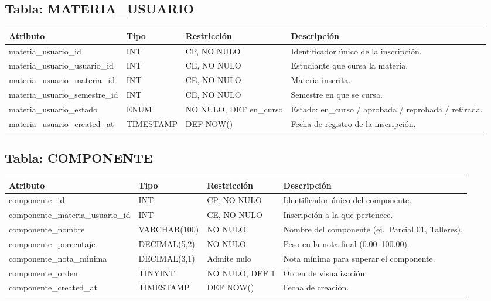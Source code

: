 \documentclass[12pt, letterpaper, twoside]{article}
\begin{document}
\subsection{Tabla: MATERIA\_USUARIO}

\begin{center}
\begin{tabular}{p{4.6cm} p{2.8cm} p{2.8cm} p{3.4cm}}
\toprule
\textbf{Atributo} & \textbf{Tipo} & \textbf{Restricción} & \textbf{Descripción} \\
\midrule
materia\_usuario\_id           & INT       & CP, NO NULO       & Identificador único de la inscripción. \\
materia\_usuario\_usuario\_id  & INT       & CE, NO NULO       & Estudiante que cursa la materia. \\
materia\_usuario\_materia\_id  & INT       & CE, NO NULO       & Materia inscrita. \\
materia\_usuario\_semestre\_id & INT       & CE, NO NULO       & Semestre en que se cursa. \\
materia\_usuario\_estado       & ENUM      & NO NULO, DEF en\_curso & Estado: en\_curso / aprobada / reprobada / retirada. \\
materia\_usuario\_created\_at  & TIMESTAMP & DEF NOW()         & Fecha de registro de la inscripción. \\
\bottomrule
\end{tabular}
\end{center}

\subsection{Tabla: COMPONENTE}

\begin{center}
\begin{tabular}{p{4.2cm} p{2.8cm} p{2.8cm} p{3.8cm}}
\toprule
\textbf{Atributo} & \textbf{Tipo} & \textbf{Restricción} & \textbf{Descripción} \\
\midrule
componente\_id                   & INT          & CP, NO NULO   & Identificador único del componente. \\
componente\_materia\_usuario\_id & INT          & CE, NO NULO   & Inscripción a la que pertenece. \\
componente\_nombre               & VARCHAR(100) & NO NULO       & Nombre del componente (ej.\ Parcial 01, Talleres). \\
componente\_porcentaje           & DECIMAL(5,2) & NO NULO       & Peso en la nota final (0.00--100.00). \\
componente\_nota\_minima         & DECIMAL(3,1) & Admite nulo   & Nota mínima para superar el componente. \\
componente\_orden                & TINYINT      & NO NULO, DEF 1 & Orden de visualización. \\
componente\_created\_at          & TIMESTAMP    & DEF NOW()     & Fecha de creación. \\
\bottomrule
\end{tabular}
\end{center}
\end{document}
